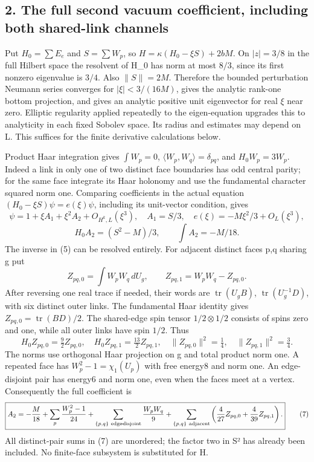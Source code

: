 \documentclass[
  11pt,
]{article}
\begin{document}
\subsection{2. The full second vacuum coefficient, including both
shared-link
channels}\label{magnetic-part-10-the-full-second-vacuum-coefficient-including-both-shared-link-channels}

Put \(H_0=\sum E_e\) and \(S=\sum W_p\), so \(H=\kappa(H_0-\xi S)+2bM\).
On \(|z|=3/8\) in the full Hilbert space the resolvent of H\_0 has norm
at most \(8/3\), since its first nonzero eigenvalue is \(3/4\). Also
\(\|S\|=2M\). Therefore the bounded perturbation Neumann series
converges for \(|\xi|<3/(16M)\), gives the analytic rank-one bottom
projection, and gives an analytic positive unit eigenvector for real
\(\xi\) near zero. Elliptic regularity applied repeatedly to the
eigen-equation upgrades this to analyticity in each fixed Sobolev space.
Its radius and estimates may depend on L. This suffices for the finite
derivative calculations below.

Product Haar integration gives \(\int W_p=0\),
\(\langle W_p,W_q\rangle=\delta_{pq}\), and \(H_0W_p=3W_p\). Indeed a
link in only one of two distinct face boundaries has odd central parity;
for the same face integrate its Haar holonomy and use the fundamental
character squared norm one. Comparing coefficients in the actual
equation \((H_0-\xi S)\psi=e(\xi)\psi\), including its unit-vector
condition, gives \[
 \psi=1+\xi A_1+\xi^2A_2+O_{H^k,L}(\xi^3),\quad A_1=S/3,
 \quad e(\xi)=-M\xi^2/3+O_L(\xi^3),
\] \[
 H_0A_2=(S^2-M)/3,\qquad\int A_2=-M/18.
\tag{5}
\] The inverse in (5) can be resolved entirely. For adjacent distinct
faces p,q sharing g put \[
 Z_{pq,0}=\int W_pW_q\,dU_g,\qquad
 Z_{pq,1}=W_pW_q-Z_{pq,0}.
\] After reversing one real trace if needed, their words are
\(\operatorname{tr}(U_gB)\), \(\operatorname{tr}(U_g^{-1}D)\), with six
distinct outer links. The fundamental Haar identity gives
\(Z_{pq,0}=\operatorname{tr}(BD)/2\). The shared-edge spin tensor
\(1/2\otimes1/2\) consists of spins zero and one, while all outer links
have spin \(1/2\). Thus \[
 H_0Z_{pq,0}=\tfrac92 Z_{pq,0},\quad
 H_0Z_{pq,1}=\tfrac{13}2Z_{pq,1},\quad
 \|Z_{pq,0}\|^2=\tfrac14,\quad\|Z_{pq,1}\|^2=\tfrac34.
\tag{6}
\] The norms use orthogonal Haar projection on g and total product norm
one. A repeated face has \(W_p^2-1=\chi_1(U_p)\) with free energy8 and
norm one. An edge-disjoint pair has energy6 and norm one, even when the
faces meet at a vertex. Consequently the full coefficient is \[
 \boxed{A_2=-\frac M{18}+\sum_p\frac{W_p^2-1}{24}
 +\sum_{\{p,q\}\ {\rm edge\!\!-\!\!disjoint}}\frac{W_pW_q}{9}
 +\sum_{\{p,q\}\ {\rm adjacent}}
       \left(\frac4{27}Z_{pq,0}+\frac4{39}Z_{pq,1}\right).}
\tag{7}
\] All distinct-pair sums in (7) are unordered; the factor two in S² has
already been included. No finite-face subsystem is substituted for H.
\end{document}
